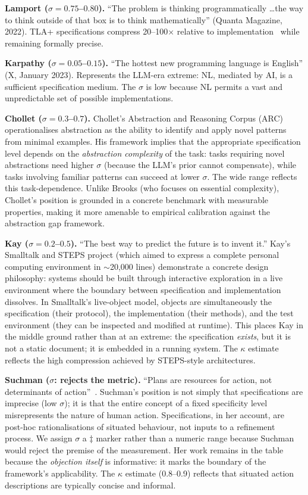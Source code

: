 \documentclass[11pt, a4paper, copyright]{googledeepmind}
\begin{document}
\textbf{Lamport ($\sigma = 0.75$--$0.80$).} ``The problem is thinking programmatically \ldots the way to think outside of that box is to think mathematically'' (Quanta Magazine, 2022). TLA+ specifications compress 20--100$\times$ relative to implementation~\citep{newcombe2015amazon} while remaining formally precise.

\textbf{Karpathy ($\sigma = 0.05$--$0.15$).} ``The hottest new programming language is English'' (X, January 2023). Represents the LLM-era extreme: NL, mediated by AI, is a sufficient specification medium. The $\sigma$ is low because NL permits a vast and unpredictable set of possible implementations.

\textbf{Chollet ($\sigma = 0.3$--$0.7$).} Chollet's Abstraction and Reasoning Corpus (ARC)~\citep{chollet2019measure} operationalises abstraction as the ability to identify and apply novel patterns from minimal examples. His framework implies that the appropriate specification level depends on the \emph{abstraction complexity} of the task: tasks requiring novel abstractions need higher $\sigma$ (because the LLM's prior cannot compensate), while tasks involving familiar patterns can succeed at lower $\sigma$. The wide range reflects this task-dependence. Unlike Brooks (who focuses on essential complexity), Chollet's position is grounded in a concrete benchmark with measurable properties, making it more amenable to empirical calibration against the abstraction gap framework.

\textbf{Kay ($\sigma = 0.2$--$0.5$).} ``The best way to predict the future is to invent it.'' Kay's Smalltalk and STEPS project (which aimed to express a complete personal computing environment in $\sim$20,000 lines) demonstrate a concrete design philosophy: systems should be built through interactive exploration in a live environment where the boundary between specification and implementation dissolves. In Smalltalk's live-object model, objects are simultaneously the specification (their protocol), the implementation (their methods), and the test environment (they can be inspected and modified at runtime). This places Kay in the middle ground rather than at an extreme: the specification \emph{exists}, but it is not a static document; it is embedded in a running system. The $\kappa$ estimate reflects the high compression achieved by STEPS-style architectures.

\textbf{Suchman ($\sigma$: rejects the metric).} ``Plans are resources for action, not determinants of action''~\citep{suchman1987plans}. Suchman's position is not simply that specifications are imprecise (low $\sigma$); it is that the entire concept of a fixed specificity level misrepresents the nature of human action. Specifications, in her account, are post-hoc rationalisations of situated behaviour, not inputs to a refinement process. We assign $\sigma$ a $\ddagger$ marker rather than a numeric range because Suchman would reject the premise of the measurement. Her work remains in the table because the \emph{objection itself} is informative: it marks the boundary of the framework's applicability. The $\kappa$ estimate (0.8--0.9) reflects that situated action descriptions are typically concise and informal.
\end{document}
